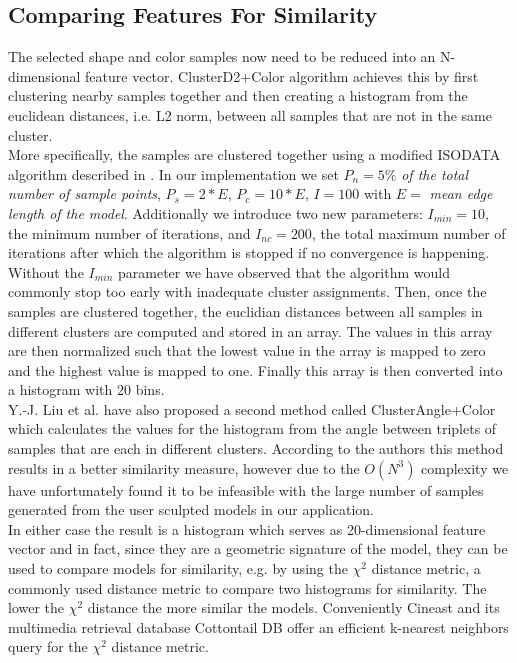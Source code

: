 \subsection{Comparing Features For Similarity}

The selected shape and color samples now need to be reduced into an N-dimensional feature vector. ClusterD2+Color algorithm achieves this by first clustering nearby samples together and then
creating a histogram from the euclidean distances, i.e. L2 norm, between all samples that are not in the same cluster.\\
More specifically, the samples are clustered together using a modified
ISODATA algorithm described in \cite{cluster_d2_color}. In our implementation we set $P_n = 5\%$ \textit{of the total number of sample points}, $P_s = 2 * E$, $P_c = 10 * E$, $I = 100$ with $E =$ \textit{mean edge length of the model}.
Additionally we introduce two new parameters: $I_{min} = 10$, the minimum number of iterations, and $I_{nc} = 200$, the total maximum number of iterations after which the algorithm is stopped if no convergence is happening. Without
the $I_{min}$ parameter we have observed that the algorithm would commonly stop too early with inadequate cluster assignments. Then, once the samples are clustered together, the euclidian distances between all samples in different clusters
are computed and stored in an array. The values in this array are then normalized such that the lowest value in the array is mapped to zero and the highest value is mapped to one. Finally this array is then converted into a histogram with $20$ bins.\\
Y.-J. Liu et al. \cite{cluster_d2_color} have also proposed a second method called ClusterAngle+Color which calculates the values for the histogram from the angle between triplets of samples that are each in different clusters. According
to the authors this method results in a better similarity measure, however due to the $O(N^3)$ complexity we have unfortunately found it to be infeasible with the large number of samples generated from the user sculpted models in our application.\\
In either case the result is a histogram which serves as 20-dimensional feature vector and in fact, since they are a geometric signature of the model, they can be used to compare models for similarity,
e.g. by using the $\chi^2$ distance metric, a commonly used distance metric to compare two histograms for similarity. The lower the $\chi^2$ distance the more similar the models. Conveniently Cineast and its multimedia retrieval
database Cottontail DB offer an efficient k-nearest neighbors query for the $\chi^2$ distance metric.\\

